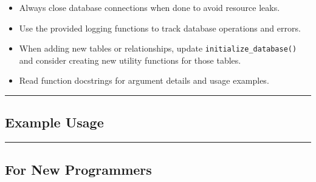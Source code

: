 \begin{itemize}
\tightlist
\item
  Always close database connections when done to avoid resource leaks.
\item
  Use the provided logging functions to track database operations and
  errors.
\item
  When adding new tables or relationships, update
  \texttt{initialize\_database()} and consider creating new utility
  functions for those tables.
\item
  Read function docstrings for argument details and usage examples.
\end{itemize}

\begin{center}\rule{0.5\linewidth}{0.5pt}\end{center}

\subsection{Example Usage}\label{example-usage}

\begin{Shaded}
\begin{Highlighting}[]

\OperatorTok{=}
\OperatorTok{=}\OperatorTok{=}\NormalTok{)}
\NormalTok{)}
\NormalTok{db\_utils.link\_files\_to\_pages([(}\NormalTok{, }\NormalTok{), (}\NormalTok{, }\NormalTok{)])}
\end{Highlighting}
\end{Shaded}

\begin{center}\rule{0.5\linewidth}{0.5pt}\end{center}

\subsection{For New Programmers}\label{for-new-programmers}

